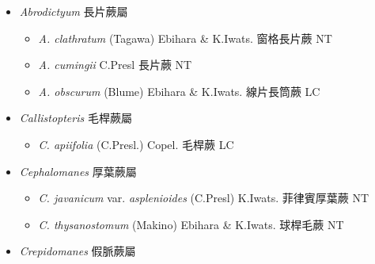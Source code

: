 
  \begin{itemize}
 \item[] \textit{Abrodictyum} 長片蕨屬
                                
  \begin{itemize}
        \item[] \textit{A. clathratum} (Tagawa) Ebihara \& K.Iwats.  窗格長片蕨   NT
        \item[] \textit{A. cumingii} C.Presl  長片蕨   NT
        \item[] \textit{A. obscurum} (Blume) Ebihara \& K.Iwats.  線片長筒蕨   LC
  \end{itemize}
 \item[] \textit{Callistopteris} 毛桿蕨屬
                                
  \begin{itemize}
        \item[] \textit{C. apiifolia} (C.Presl.) Copel.  毛桿蕨   LC
  \end{itemize}
 \item[] \textit{Cephalomanes} 厚葉蕨屬
                                
  \begin{itemize}
        \item[] \textit{C. javanicum} var. \textit{asplenioides} (C.Presl) K.Iwats. 
                                        菲律賓厚葉蕨   NT
        \item[] \textit{C. thysanostomum} (Makino) Ebihara \& K.Iwats.  球桿毛蕨   NT
  \end{itemize}
 \item[] \textit{Crepidomanes} 假脈蕨屬
                                

\end{itemize}
